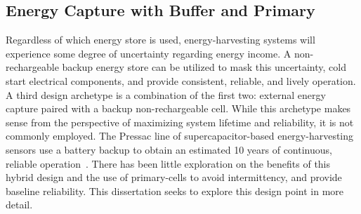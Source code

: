 \subsection{Energy Capture with Buffer and Primary}

Regardless of which energy store is used, energy-harvesting systems will
experience some degree of uncertainty regarding energy income. 
A non-rechargeable
backup energy store can be utilized to mask this uncertainty, cold
start electrical components, and provide consistent, reliable, and lively operation.
A third design archetype is a combination of the first two: 
external energy capture paired with a backup non-rechargeable cell.
While this archetype makes sense from the perspective of maximizing system lifetime and reliability, it is not commonly employed. 
The Pressac line of supercapacitor-based energy-harvesting sensors 
use a battery backup to obtain an estimated 10 years of continuous, reliable operation~\cite{pressac}.  
There has been little
exploration on the benefits of this hybrid design and the use of
primary-cells to avoid intermittency,
and provide baseline reliability. This dissertation seeks to explore this design point in more detail.




